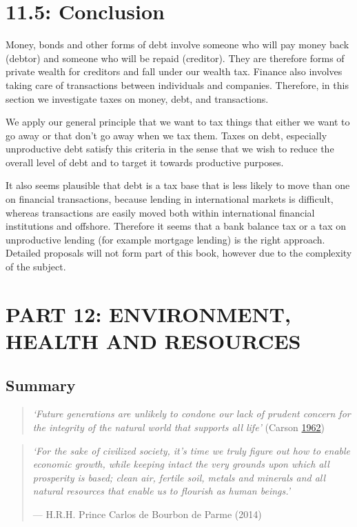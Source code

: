 \documentclass[]{tufte-handout}
\begin{document}
\hypertarget{conclusion}{%
\section{11.5: Conclusion}\label{conclusion}}

Money, bonds and other forms of debt involve someone who will pay money
back (debtor) and someone who will be repaid (creditor). They are
therefore forms of private wealth for creditors and fall under our
wealth tax. Finance also involves taking care of transactions between
individuals and companies. Therefore, in this section we investigate
taxes on money, debt, and transactions.

We apply our general principle that we want to tax things that either we
want to go away or that don't go away when we tax them. Taxes on debt,
especially unproductive debt satisfy this criteria in the sense that we
wish to reduce the overall level of debt and to target it towards
productive purposes.

It also seems plausible that debt is a tax base that is less likely to
move than one on financial transactions, because lending in
international markets is difficult, whereas transactions are easily
moved both within international financial institutions and offshore.
Therefore it seems that a bank balance tax or a tax on unproductive
lending (for example mortgage lending) is the right approach. Detailed
proposals will not form part of this book, however due to the complexity
of the subject.

\newpage

\hypertarget{part-12-environment-health-and-resources}{%
\section{PART 12: ENVIRONMENT, HEALTH AND
RESOURCES}\label{part-12-environment-health-and-resources}}

\hypertarget{summary-5}{%
\subsection{Summary}\label{summary-5}}

\begin{quote}
\emph{`Future generations are unlikely to condone our lack of prudent
concern for the integrity of the natural world that supports all life'}
(Carson \protect\hyperlink{ref-Carson1962}{1962})
\end{quote}

\begin{quote}
\emph{`For the sake of civilized society, it's time we truly figure out
how to enable economic growth, while keeping intact the very grounds
upon which all prosperity is based; clean air, fertile soil, metals and
minerals and all natural resources that enable us to flourish as human
beings.'}

\hfill --- H.R.H. Prince Carlos de Bourbon de Parme (2014)
\end{quote}
\end{document}
